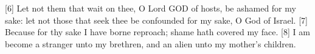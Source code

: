[6] \textcolor[cmyk]{0.99998,1,0,0}{Let not them that wait on thee, O Lord GOD of hosts, be ashamed for my sake: let not those that seek thee be confounded for my sake, O God of Israel.} %
[7] \textcolor[cmyk]{0.99998,1,0,0}{Because for thy sake I have borne reproach; shame hath covered my face.}
[8] \textcolor[cmyk]{0.99998,1,0,0}{I am become a stranger unto my brethren, and an alien unto my mother's children.} %